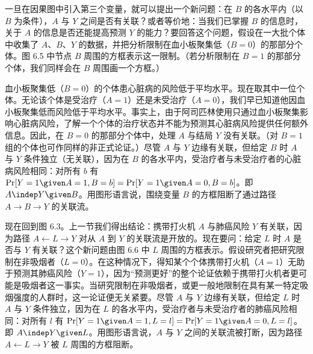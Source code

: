 \begin{figure}[htbp]
\centering
{}
\caption{}
\label{fig:6.5}
\end{figure}

一旦在因果图中引入第三个变量，就可以提出一个新问题：在 $B$ 的各水平内（以 $B$ 为条件），$A$ 与 $Y$ 之间是否有关联？或者等价地：当我们已掌握 $B$ 的信息时，关于 $A$ 的信息是否还能提高预测 $Y$ 的能力？要回答这个问题，假设在一大批个体中收集了 $A$、$B$、$Y$ 的数据，并把分析限制在血小板聚集低（$B=0$）的那部分个体。图 6.5 中节点 $B$ 周围的方框表示这一限制。（若分析限制在 $B=1$ 的那部分个体，我们同样会在 $B$ 周围画一个方框。）


血小板聚集低（$B=0$）的个体患心脏病的风险低于平均水平。现在取其中一位个体。无论该个体是受治疗（$A=1$）还是未受治疗（$A=0$），我们早已知道他因血小板聚集低而风险低于平均水平。事实上，由于阿司匹林使用只通过血小板聚集影响心脏病风险，了解一个个体的治疗状态并不能为预测其心脏病风险提供任何额外信息。因此，在 $B=0$ 的那部分个体中，处理 $A$ 与结局 $Y$ 没有关联。（对 $B=1$ 组的个体也可作同样的非正式论证。）尽管 $A$ 与 $Y$ 边缘有关联，但给定 $B$ 时 $A$ 与 $Y$ 条件独立（无关联），因为在 $B$ 的各水平内，受治疗者与未受治疗者的心脏病风险相同：对所有 $b$ 有 \mbox{$\Pr[Y=1\given A=1,B=b]=\Pr[Y=1\given A=0,B=b]$}。即 $A\indep Y\given B$。用图形语言说，围绕变量 $B$ 的方框阻断了通过路径 $A\to B\to Y$ 的关联流。

现在回到图 6.3。上一节我们得出结论：携带打火机 $A$ 与肺癌风险 $Y$ 有关联，因为路径 $A\leftarrow L\to Y$ 对从 $A$ 到 $Y$ 的关联流是开放的。现在要问：给定 $L$ 时 $A$ 是否与 $Y$ 有关联？这个新问题由图 6.6 中 $L$ 周围的方框表示。假设研究者把研究限制在非吸烟者（$L=0$）。在这种情况下，得知某个个体携带打火机（$A=1$）无助于预测其肺癌风险（$Y=1$），因为“预测更好”的整个论证依赖于携带打火机者更可能是吸烟者这一事实。当研究限制在非吸烟者，或更一般地限制在具有某一特定吸烟强度的人群时，这一论证便无关紧要。尽管 $A$ 与 $Y$ 边缘有关联，但给定 $L$ 时 $A$ 与 $Y$ 条件独立，因为在 $L$ 的各水平内，受治疗者与未受治疗者的肺癌风险相同：对所有 $l$ 有 \mbox{$\Pr[Y=1\given A=1,L=l]=\Pr[Y=1\given A=0,L=l]$}。即 $A\indep Y\given L$。用图形语言说，$A$ 与 $Y$ 之间的关联流被打断，因为路径 $A\leftarrow L\to Y$ 被 $L$ 周围的方框阻断。


